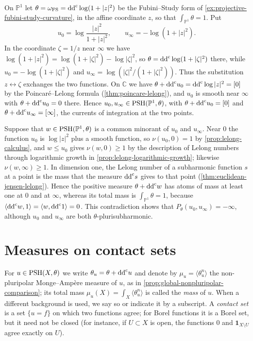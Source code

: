 \begin{example}\label{ex:empty-rooftop-projective-line}
On $\mathbb P^1$ let $\theta=\omega_{\mathrm{FS}}=\mathrm{dd}^{\mathrm{c}}\log(1+|z|^2)$ be the Fubini--Study form of \cref{ex:projective-fubini-study-curvature}, in the affine coordinate $z$, so that $\int_{\mathbb P^1}\theta=1$. Put
\[
 u_0=\log\frac{|z|^2}{1+|z|^2},\qquad u_\infty=-\log(1+|z|^2).
\]
In the coordinate $\zeta=1/z$ near $\infty$ we have $\log(1+|z|^2)=\log(1+|\zeta|^2)-\log|\zeta|^2$, so $\theta=\mathrm{dd}^{\mathrm{c}}\log(1+|\zeta|^2)$ there, while $u_0=-\log(1+|\zeta|^2)$ and $u_\infty=\log(|\zeta|^2/(1+|\zeta|^2))$. Thus the substitution $z\leftrightarrow\zeta$ exchanges the two functions. On $\mathbb C$ we have $\theta+\mathrm{dd}^{\mathrm{c}} u_0=\mathrm{dd}^{\mathrm{c}}\log|z|^2=[0]$ by the Poincar\'e--Lelong formula (\cref{thm:poincare-lelong}), and $u_0$ is smooth near $\infty$ with $\theta+\mathrm{dd}^{\mathrm{c}} u_0=0$ there. Hence $u_0,u_\infty\in\mathrm{PSH}(\mathbb P^1,\theta)$, with $\theta+\mathrm{dd}^{\mathrm{c}} u_0=[0]$ and $\theta+\mathrm{dd}^{\mathrm{c}} u_\infty=[\infty]$, the currents of integration at the two points.

Suppose that $w\in\mathrm{PSH}(\mathbb P^1,\theta)$ is a common minorant of $u_0$ and $u_\infty$. Near $0$ the function $u_0$ is $\log|z|^2$ plus a smooth function, so $\nu(u_0,0)=1$ by \cref{prop:lelong-calculus}, and $w\leq u_0$ gives $\nu(w,0)\geq1$ by the description of Lelong numbers through logarithmic growth in \cref{prop:lelong-logarithmic-growth}; likewise $\nu(w,\infty)\geq1$. In dimension one, the Lelong number of a subharmonic function $s$ at a point is the mass that the measure $\mathrm{dd}^{\mathrm{c}} s$ gives to that point (\cref{thm:euclidean-jensen-lelong}). Hence the positive measure $\theta+\mathrm{dd}^{\mathrm{c}} w$ has atoms of mass at least one at $0$ and at $\infty$, whereas its total mass is $\int_{\mathbb P^1}\theta=1$, because $\langle\mathrm{dd}^{\mathrm{c}} w,1\rangle=\langle w,\mathrm{dd}^{\mathrm{c}}1\rangle=0$. This contradiction shows that $P_\theta(u_0,u_\infty)=-\infty$, although $u_0$ and $u_\infty$ are both $\theta$-plurisubharmonic.
\end{example}

\section{Measures on contact sets}
\label{sec:envelope-contact-measures}
For $u\in\mathrm{PSH}(X,\theta)$ we write $\theta_u=\theta+\mathrm{dd}^{\mathrm{c}} u$ and denote by $\mu_u=\langle\theta_u^n\rangle$ the non-pluripolar Monge--Amp\`ere measure of $u$, as in \cref{prop:global-nonpluripolar-comparison}; its total mass $\mu_u(X)=\int_X\langle\theta_u^n\rangle$ is called the \emph{mass} of $u$. When a different background is used, we say so or indicate it by a subscript. A \emph{contact set} is a set $\{u=f\}$ on which two functions agree; for Borel functions it is a Borel set, but it need not be closed (for instance, if $U\subset X$ is open, the functions $0$ and $\mathbf1_{X\setminus U}$ agree exactly on $U$).

